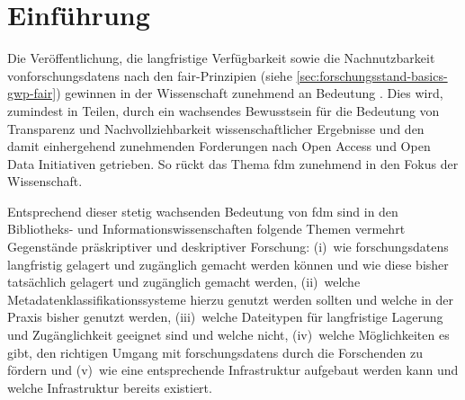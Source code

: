 \chapter{Einführung}\label{ch:einfuehrung}

Die Veröffentlichung, die langfristige Verfügbarkeit sowie die Nachnutzbarkeit von\linebreak \glspl{forschungsdaten} nach den \gls{fair}-Prinzipien (siehe \cref{sec:forschungsstand-basics-gwp-fair}) gewinnen in der Wissenschaft zunehmend an Bedeutung \autocite{TenopirEtAl2017}.
Dies wird, zumindest in Teilen, durch ein wachsendes Bewusstsein für die Bedeutung von Transparenz und Nachvollziehbarkeit wissenschaftlicher Ergebnisse und den damit einhergehend zunehmenden Forderungen nach Open Access und Open Data Initiativen getrieben.
So rückt das Thema \gls{fdm} zunehmend in den Fokus der Wissenschaft.

Entsprechend dieser stetig wachsenden Bedeutung von \gls{fdm} sind in den Bibliotheks- und Informationswissenschaften folgende Themen vermehrt Gegenstände präskriptiver und deskriptiver Forschung:
(i)~wie \glspl{forschungsdaten} langfristig gelagert und zugänglich gemacht werden können und wie diese bisher tatsächlich gelagert und zugänglich gemacht werden,
(ii)~welche Metadatenklassifikationssysteme hierzu genutzt werden sollten und welche in der Praxis bisher genutzt werden,
(iii)~welche Dateitypen für langfristige Lagerung und Zugänglichkeit geeignet sind und welche nicht,
(iv)~welche Möglichkeiten es gibt, den richtigen Umgang mit \glspl{forschungsdaten} durch die Forschenden zu fördern und
(v)~wie eine entsprechende Infrastruktur aufgebaut werden kann und welche Infrastruktur bereits existiert.

